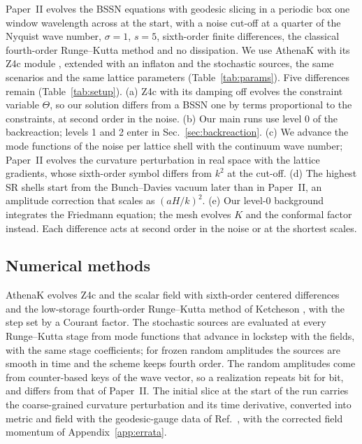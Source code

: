 \documentclass[aps,prd,twocolumn,10pt,superscriptaddress,nofootinbib,longbibliography,floatfix]{revtex4-2}
\newcommand{\Ptwo}{Paper~II}
\begin{document}
\Ptwo{} evolves the BSSN equations \cite{Shibata:1995,Baumgarte:1998} with geodesic slicing in a periodic box one window wavelength across at the start, with a noise cut-off at a quarter of the Nyquist wave number, $\sigma = 1$, $s = 5$, sixth-order finite differences, the classical fourth-order Runge--Kutta method and no dissipation. We use AthenaK \cite{Stone:2024athenak} with its Z4c module \cite{Bernuzzi:2010,Zhu:2024utz}, extended with an inflaton and the stochastic sources, the same scenarios and the same lattice parameters (Table~\ref{tab:params}). Five differences remain (Table~\ref{tab:setup}). (a) Z4c with its damping off evolves the constraint variable $\Theta$, so our solution differs from a BSSN one by terms proportional to the constraints, at second order in the noise. (b) Our main runs use level 0 of the backreaction; levels 1 and 2 enter in Sec.~\ref{sec:backreaction}. (c) We advance the mode functions of the noise per lattice shell with the continuum wave number; \Ptwo{} evolves the curvature perturbation in real space with the lattice gradients, whose sixth-order symbol differs from $k^2$ at the cut-off. (d) The highest SR shells start from the Bunch--Davies vacuum later than in \Ptwo{}, an amplitude correction that scales as $(aH/k)^2$. (e) Our level-0 background integrates the Friedmann equation; the mesh evolves $K$ and the conformal factor instead. Each difference acts at second order in the noise or at the shortest scales.

\subsection{Numerical methods}\label{sec:methods}

AthenaK evolves Z4c and the scalar field with sixth-order centered differences and the low-storage fourth-order Runge--Kutta method of Ketcheson \cite{Ketcheson:2010}, with the step set by a Courant factor. The stochastic sources are evaluated at every Runge--Kutta stage from mode functions that advance in lockstep with the fields, with the same stage coefficients; for frozen random amplitudes the sources are smooth in time and the scheme keeps fourth order. The random amplitudes come from counter-based keys of the wave vector, so a realization repeats bit for bit, and differs from that of \Ptwo{}. The initial slice at the start of the run carries the coarse-grained curvature perturbation and its time derivative, converted into metric and field with the geodesic-gauge data of Ref.~\cite{Launay:2025bd}, with the corrected field momentum of Appendix~\ref{app:errata}.
\end{document}
